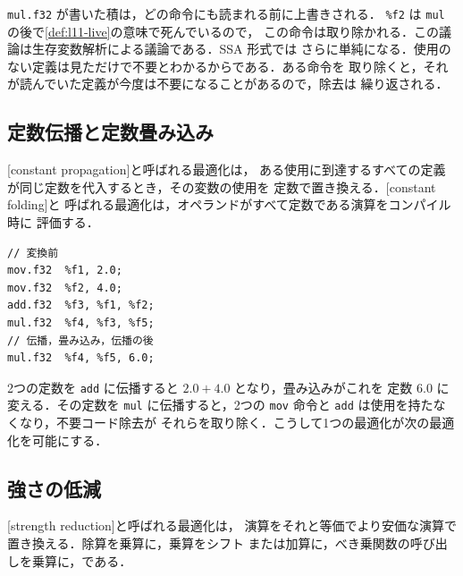 \documentclass[../main.tex]{subfiles}
\begin{document}
\texttt{mul.f32} が書いた積は，どの命令にも読まれる前に上書きされる．
\texttt{\%f2} は \texttt{mul} の後で\cref{def:l11-live}の意味で死んでいるので，
この命令は取り除かれる．この議論は生存変数解析による議論である．SSA 形式では
さらに単純になる．使用のない定義は見ただけで不要とわかるからである．ある命令を
取り除くと，それが読んでいた定義が今度は不要になることがあるので，除去は
繰り返される．

\subsection{定数伝播と定数畳み込み}

\begin{definition}[定数伝播と定数畳み込み]
  \label{def:l11-constprop}
  [constant propagation]と呼ばれる最適化は，
  ある使用に到達するすべての定義が同じ定数を代入するとき，その変数の使用を
  定数で置き換える．[constant folding]と
  呼ばれる最適化は，オペランドがすべて定数である演算をコンパイル時に
  評価する．
\end{definition}

\begin{lstlisting}[language=PTX, numbers=none]
// 変換前
mov.f32  %f1, 2.0;
mov.f32  %f2, 4.0;
add.f32  %f3, %f1, %f2;
mul.f32  %f4, %f3, %f5;
// 伝播，畳み込み，伝播の後
mul.f32  %f4, %f5, 6.0;
\end{lstlisting}

2つの定数を \texttt{add} に伝播すると $2.0 + 4.0$ となり，畳み込みがこれを
定数 $6.0$ に変える．その定数を \texttt{mul} に伝播すると，2つの
\texttt{mov} 命令と \texttt{add} は使用を持たなくなり，不要コード除去が
それらを取り除く．こうして1つの最適化が次の最適化を可能にする．

\subsection{強さの低減}

\begin{definition}[強さの低減]
  \label{def:l11-strength}
  [strength reduction]と呼ばれる最適化は，
  演算をそれと等価でより安価な演算で置き換える．除算を乗算に，乗算をシフト
  または加算に，べき乗関数の呼び出しを乗算に，である．
\end{definition}
\end{document}
